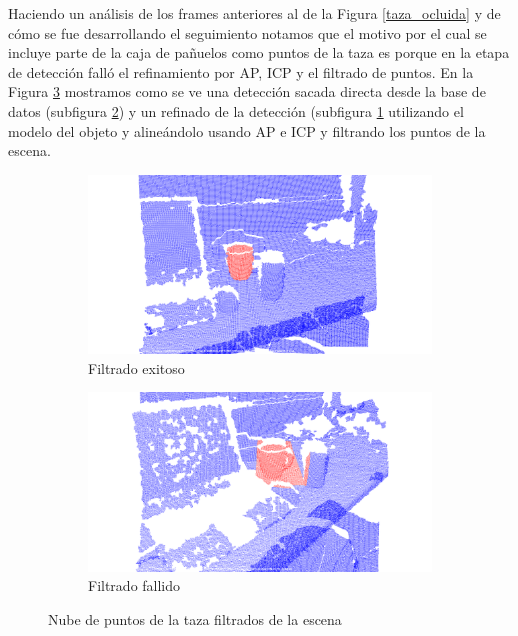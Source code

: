Haciendo un análisis de los frames anteriores al de la Figura \ref{taza_ocluida} y de cómo se fue desarrollando el seguimiento notamos que el motivo por el cual se incluye parte de la caja de pañuelos como puntos de la taza es porque en la etapa de detección falló el refinamiento por AP, ICP y el filtrado de puntos. En la Figura \ref{filtro_en_deteccion} mostramos como se ve una detección sacada directa desde la base de datos (subfigura \ref{filtro_en_deteccion_mal}) y un refinado de la detección (subfigura \ref{filtro_en_deteccion_bien} utilizando el modelo del objeto y alineándolo usando AP e ICP y filtrando los puntos de la escena.

\begin{figure}
	\centering
	\begin{subfigure}[b]{\textwidth}
		\includegraphics[width=\textwidth]{img/taza_filtrado_exitoso_definitivo_depth_frame12.png}
		\caption{Filtrado exitoso}
		\label{filtro_en_deteccion_bien}
	\end{subfigure}
	\quad
	\begin{subfigure}[b]{\textwidth}
		\includegraphics[width=\textwidth]{img/taza_filtrado_fallido_depth_simil_thresh_01_frame66.png}
		\caption{Filtrado fallido}
		\label{filtro_en_deteccion_mal}
	\end{subfigure}
	\caption{Nube de puntos de la taza filtrados de la escena}
	\label{filtro_en_deteccion}
\end{figure}

